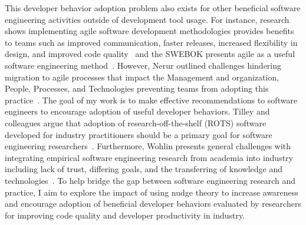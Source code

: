 This developer behavior adoption problem also exists for other beneficial software engineering activities outside of development tool usage. For instance, research shows implementing agile software development methodologies provides benefits to teams such as improved communication, faster releases, increased flexibility in design, and improved code quality~\cite{begel2007usage} and the SWEBOK presents agile as a useful software engineering method~\cite[p.~9-9]{SWEBOK}. However, Nerur outlined challenges hindering migration to agile processes that impact the Management and organization, People, Processes, and Technologies preventing teams from adopting this practice~\cite{nerur2005challenges}. The goal of my work is to make effective recommendations to software engineers to encourage adoption of useful developer behaviors. Tilley and colleagues argue that adoption of research-off-the-shelf (ROTS) software developed for industry practitioners should be a primary goal for software engineering researchers~\cite{Tilley2003ROTS}. Furthermore, Wohlin presents general challenges with integrating empirical software engineering research from academia into industry including lack of trust, differing goals, and the transferring of knowledge and technologies~\cite{wohlin2013empirical}. To help bridge the gap between software engineering research and practice, I aim to explore the impact of using nudge theory to increase awareness and encourage adoption of beneficial developer behaviors evaluated by researchers for improving code quality and developer productivity in industry.

 


